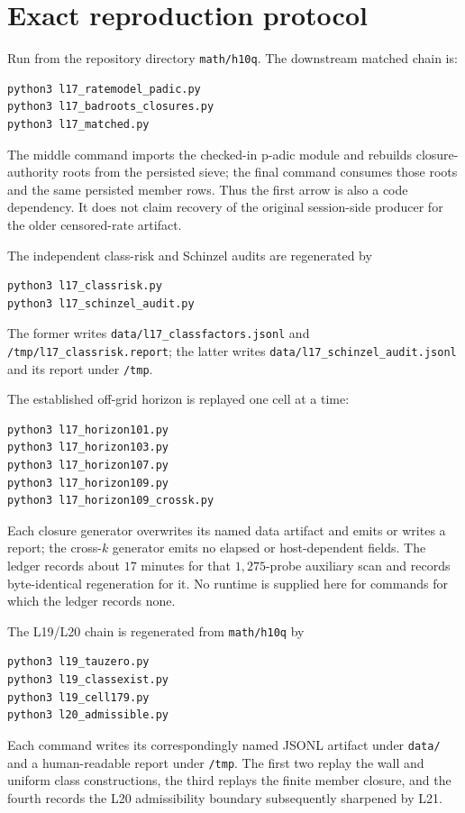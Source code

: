 \documentclass[11pt]{amsart}%
\begin{document}
\section{Exact reproduction protocol}

Run from the repository directory \texttt{math/h10q}.  The downstream matched
chain is:
\begin{verbatim}
python3 l17_ratemodel_padic.py
python3 l17_badroots_closures.py
python3 l17_matched.py
\end{verbatim}
The middle command imports the checked-in p-adic module and rebuilds closure-
authority roots from the persisted sieve; the final command consumes those
roots and the same persisted member rows.  Thus the first arrow is also a code
dependency.  It does not claim recovery of the original session-side producer
for the older censored-rate artifact.

The independent class-risk and Schinzel audits are regenerated by
\begin{verbatim}
python3 l17_classrisk.py
python3 l17_schinzel_audit.py
\end{verbatim}
The former writes \texttt{data/l17\_classfactors.jsonl} and
\texttt{/tmp/l17\_classrisk.report}; the latter writes
\texttt{data/l17\_schinzel\_audit.jsonl} and its report under
\texttt{/tmp}.

The established off-grid horizon is replayed one cell at a time:
\begin{verbatim}
python3 l17_horizon101.py
python3 l17_horizon103.py
python3 l17_horizon107.py
python3 l17_horizon109.py
python3 l17_horizon109_crossk.py
\end{verbatim}
Each closure generator overwrites its named data artifact and emits or writes a
report; the cross-\(k\) generator emits no elapsed or host-dependent fields.
The ledger records about \(17\) minutes for that \(1{,}275\)-probe auxiliary
scan and records byte-identical regeneration for it.  No runtime is supplied
here for commands for which the ledger records none.

The L19/L20 chain is regenerated from \texttt{math/h10q} by
\begin{verbatim}
python3 l19_tauzero.py
python3 l19_classexist.py
python3 l19_cell179.py
python3 l20_admissible.py
\end{verbatim}
Each command writes its correspondingly named JSONL artifact under
\texttt{data/} and a human-readable report under \texttt{/tmp}.  The first
two replay the wall and uniform class constructions, the third replays the
finite member closure, and the fourth records the L20 admissibility boundary
subsequently sharpened by L21.
\end{document}
